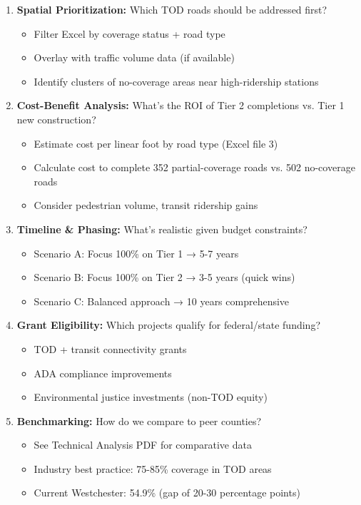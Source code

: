 \documentclass[11pt,letterpaper]{article}
\begin{document}
\begin{enumerate}[leftmargin=*]
    \item \textbf{Spatial Prioritization:} Which TOD roads should be addressed first?
    \begin{itemize}
        \item Filter Excel by coverage status + road type
        \item Overlay with traffic volume data (if available)
        \item Identify clusters of no-coverage areas near high-ridership stations
    \end{itemize}

    \item \textbf{Cost-Benefit Analysis:} What's the ROI of Tier 2 completions vs. Tier 1 new construction?
    \begin{itemize}
        \item Estimate cost per linear foot by road type (Excel file 3)
        \item Calculate cost to complete 352 partial-coverage roads vs. 502 no-coverage roads
        \item Consider pedestrian volume, transit ridership gains
    \end{itemize}

    \item \textbf{Timeline \& Phasing:} What's realistic given budget constraints?
    \begin{itemize}
        \item Scenario A: Focus 100\% on Tier 1 → 5-7 years
        \item Scenario B: Focus 100\% on Tier 2 → 3-5 years (quick wins)
        \item Scenario C: Balanced approach → 10 years comprehensive
    \end{itemize}

    \item \textbf{Grant Eligibility:} Which projects qualify for federal/state funding?
    \begin{itemize}
        \item TOD + transit connectivity grants
        \item ADA compliance improvements
        \item Environmental justice investments (non-TOD equity)
    \end{itemize}

    \item \textbf{Benchmarking:} How do we compare to peer counties?
    \begin{itemize}
        \item See Technical Analysis PDF for comparative data
        \item Industry best practice: 75-85\% coverage in TOD areas
        \item Current Westchester: 54.9\% (gap of 20-30 percentage points)
    \end{itemize}
\end{enumerate}
\end{document}
